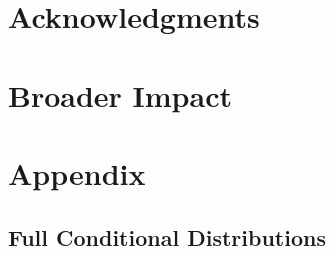 \documentclass{article}
\begin{document}
	\section*{Acknowledgments}
	
	\section*{Broader Impact}
	
	\newpage
	{
		\small
		
	}
	
	
	\appendix
	
	\section{Appendix}
	
	\subsection{Full Conditional Distributions}
	
\end{document}
